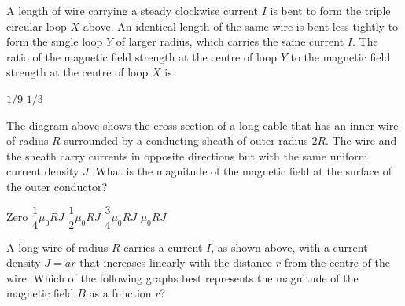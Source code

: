 \documentclass[12pt]{../../oss-apphys-exam}
\begin{document}
\begin{questions}
  \question A length of wire carrying a steady clockwise current $I$ is bent
  to form the triple circular loop $X$ above. An identical length of the same
  wire is bent less tightly to form the single loop $Y$ of larger radius, which
  carries the same current $I$. The ratio of the magnetic field strength at the
  centre of loop $Y$ to the magnetic field strength at the centre of loop $X$ is
  \begin{choices}
    \choice $1/9$
    \choice $1/3$
  \end{choices}
  \newpage
  
  \question The diagram above shows the cross section of a long cable that has
  an inner wire of radius $R$ surrounded by a conducting sheath of outer radius
  $2R$. The wire and the sheath carry currents in opposite directions but with
  the same uniform current density $J$. What is the magnitude of the magnetic
  field at the surface of the outer conductor?
  \begin{choices}
    \choice Zero
    \choice $\dfrac14\mu_0RJ$
    \choice $\dfrac12\mu_0RJ$
    \choice $\dfrac34\mu_0RJ$
    \choice $\mu_0RJ$
  \end{choices}
  \newpage
  
  \question A long wire of radius $R$ carries a current $I$, as
  shown above, with a current density $J=ar$ that increases linearly with the
  distance $r$ from the centre of the wire. Which of the following graphs best
  represents the magnitude of the magnetic field $B$ as a function $r$?


\end{questions}
\end{document}
